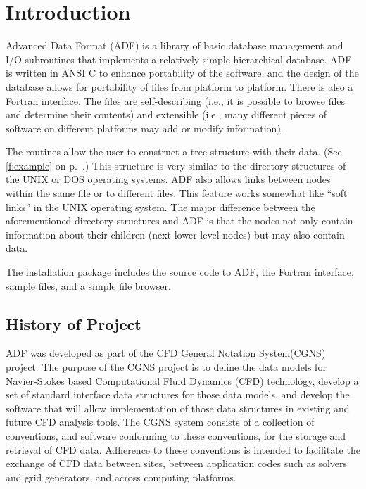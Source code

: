 \section{Introduction}
\label{s:intro}
\thispagestyle{plain}

Advanced Data Format (ADF) is a library of basic database management
and I/O subroutines that implements a relatively simple hierarchical
database.
ADF is written in ANSI C to enhance portability of the software, and the
design of the database allows for portability of files from platform to
platform.
There is also a Fortran interface.
The files are self-describing (i.e., it is possible to browse files and
determine their contents) and extensible (i.e., many different pieces of
software on different platforms may add or modify information).

The routines allow the user to construct a tree structure with their data.
(See \autoref{f:example} on p.~\pageref*{f:example}.)
This structure is very similar to the directory structures of the UNIX
or DOS operating systems.
ADF also allows links between nodes within the same file or to different
files.
This feature works somewhat like ``soft links'' in the UNIX operating
system.
The major difference between the aforementioned directory structures and
ADF is that the nodes not only contain information about their children
(next lower-level nodes) but may also contain data.

The installation package includes the source code to ADF, the Fortran
interface, sample files, and a simple file browser.

\subsection{History of Project}

ADF was developed as part of the CFD
General Notation System(CGNS) project.
The purpose of the CGNS project is to define the data models for
Navier-Stokes based Computational Fluid Dynamics (CFD) technology,
develop a set of standard interface data structures for those data
models, and develop the software that will allow implementation of those
data structures in existing and future CFD analysis tools.
The CGNS system consists of a collection of conventions, and software
conforming to these conventions, for the storage and retrieval of CFD
data.
Adherence to these conventions is intended to facilitate the exchange of
CFD data between sites, between application codes such as solvers and
grid generators, and across computing platforms.

